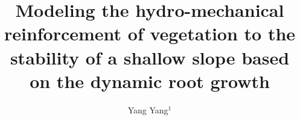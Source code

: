 %
%
%
%
%

%
\RequirePackage{fix-cm}
%
\documentclass{svjour3}                     %
%
\smartqed  %
%
\usepackage{graphicx}
\usepackage{natbib}
\renewcommand{\figurename}{Fig.}
\newcommand{\reffig}[1]{Fig. \ref{#1}}
\usepackage{graphicx}
\usepackage{amsmath,amsfonts}
\usepackage{multirow,booktabs}
\usepackage{subfigure}
\usepackage{setspace}
\usepackage{lineno}
\usepackage{color}


%
%
%
%


%


\title{Modeling the hydro-mechanical reinforcement of vegetation to the stability of a shallow slope based on the dynamic root growth
}


\author{Yang Yang$^1$
}

